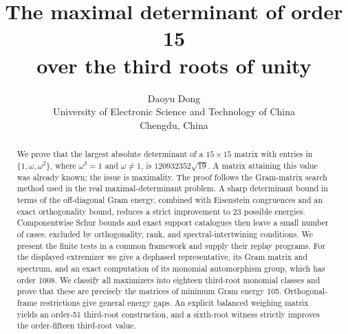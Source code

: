 \documentclass[11pt,a4paper]{article}
\title{The maximal determinant of order 15\\over the third roots of unity}
\author{Daoyu Dong\\[4pt]
  \small University of Electronic Science and Technology of China\\
  \small Chengdu, China}
\date{}
\theoremstyle{remark}
\begin{document}
\maketitle
\begin{abstract}
We prove that the largest absolute determinant of a $15\times15$ matrix with entries in $\{1,\omega,\omega^2\}$, where $\omega^3=1$ and $\omega\ne1$, is $120932352\sqrt{19}$. A matrix attaining this value was already known; the issue is maximality. The proof follows the Gram-matrix search method used in the real maximal-determinant problem. A sharp determinant bound in terms of the off-diagonal Gram energy, combined with Eisenstein congruences and an exact orthogonality bound, reduces a strict improvement to 23 possible energies. Componentwise Schur bounds and exact support catalogues then leave a small number of cases, excluded by orthogonality, rank, and spectral-intertwining conditions. We present the finite tests in a common framework and supply their replay programs. For the displayed extremizer we give a dephased representative, its Gram matrix and spectrum, and an exact computation of its monomial automorphism group, which has order 1008. We classify all maximizers into eighteen third-root monomial classes and prove that these are precisely the matrices of minimum Gram energy 105. Orthogonal-frame restrictions give general energy gaps. An explicit balanced weighing matrix yields an order-51 third-root construction, and a sixth-root witness strictly improves the order-fifteen third-root value.
\end{abstract}









\appendix


\clearpage

\clearpage





\clearpage

\end{document}
